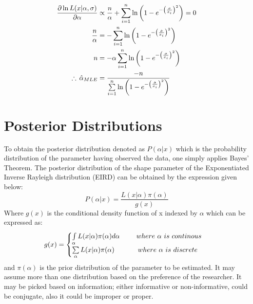 \documentclass[a4paper,12pt]{report}
\newcommand{\para}{\hspace{0.5cm}}
\begin{document}
\begin{equation}
\begin{split}
\frac{{\partial \ln L(x|\alpha ,\sigma )}}{{\partial \alpha }} &\propto\frac{n}{\alpha}+\sum\limits_{ i=1 }^{n} {\ln \left( {1 - {e^{ - {{\left( {\frac{\sigma }{x_i}} \right)}^2}}}} \right)}=0\\
\frac{n}{\alpha}&=-\sum\limits_{ i=1 }^{n} {\ln \left( {1 - {e^{ - {{\left( {\frac{\hat{\sigma} }{x_i}} \right)}^2}}}} \right)}
\\n&=-\alpha\sum\limits_{ i=1 }^{n} {\ln \left( {1 - {e^{ - {{\left( {\frac{\sigma }{x_i}} \right)}^2}}}} \right)}\\
\therefore\, \hat{\alpha}_{\small{MLE}}&=\frac{-n}{\sum\limits_{ i=1 }^{n} {\ln \left( {1 - {e^{ - {{\left( {\frac{\hat{\sigma} }{x_i}} \right)}^2}}}} \right)}}
\end{split}\label{3.7}
\end{equation}

\section{Posterior Distributions}
%
\noindent\para To obtain the posterior distribution denoted as $P(\alpha|x)$ which is the probability distribution of the parameter having observed the data, one simply applies Bayes’ Theorem. The posterior distribution of the shape parameter of the Exponentiated Inverse Rayleigh distribution (EIRD) can be obtained by the expression given below:
\begin{equation}\label{3.16}
P(\alpha|x)=\frac{L(x|\alpha)\pi(\alpha)}{g(x)}
\end{equation} 
\noindent Where $g(x)$ is the conditional density function of x indexed by $\alpha$ which can be expressed as:
\begin{equation}\label{3.17}
g(x)=
\begin{cases}
\int\limits_{\alpha} L(x|\alpha)\pi(\alpha) d\alpha \para\quad where\ \alpha\ is\ continous \\
\sum\limits_{\alpha} L(x|\alpha)\pi(\alpha) \para\qquad where\ \alpha\ is\ discrete
\end{cases}
\end{equation}
\noindent and $\pi(\alpha)$ is the prior distribution of the parameter to be estimated. It may assume more than one distribution based on the preference of the researcher. It may be picked based on information; either informative or non-informative, could be conjugate, also it could be improper or proper.
\end{document}
